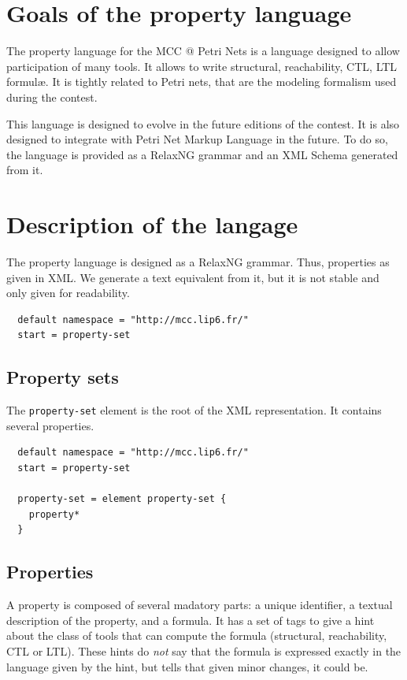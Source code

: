 \documentclass[10pt,english,a4paper]{article}
\newcommand{\mcc}[0]{MCC}
\begin{document}
\color{defaultcolor}

\section*{Goals of the property language}
The property language for the \mcc{} @ Petri Nets is a language designed to allow
participation of many tools.
It allows to write structural, reachability, CTL, LTL formul{\ae}.
It is tightly related to Petri nets, that are the modeling formalism used during the contest.

This language is designed to evolve in the future editions of the contest.
It is also designed to integrate with Petri Net Markup Language in the future.
To do so, the language is provided as a RelaxNG grammar and an XML Schema generated from it.

\tableofcontents
\clearpage

\section{Description of the langage}
The property language is designed as a RelaxNG grammar. Thus, properties as given in XML.
We generate a text equivalent from it, but it is not stable and only given for readability.

\begin{lstlisting}
  default namespace = "http://mcc.lip6.fr/"
  start = property-set
\end{lstlisting}
\subsection{Property sets}
The \lstinline[language=xsd]!property-set! element is the root of the XML representation.
It contains several properties.
\begin{lstlisting}
  default namespace = "http://mcc.lip6.fr/"
  start = property-set

  property-set = element property-set {
    property*
  }
\end{lstlisting}

\subsection{Properties}
A property is composed of several madatory parts: a unique identifier, a textual description
of the property, and a formula.
It has a set of tags to give a hint about the class of tools that can compute the formula
(structural, reachability, CTL or LTL). These hints do \emph{not} say that the formula
is expressed exactly in the language given by the hint, but tells that given minor changes,
it could be.
\end{document}
